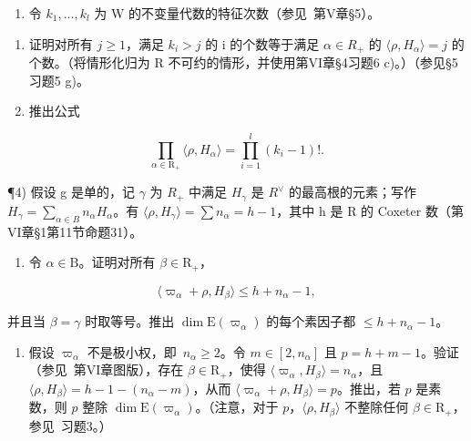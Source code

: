 \begin{enumerate}
\def\labelenumi{\arabic{enumi})}
\setcounter{enumi}{2}
\tightlist
\item
  令 \(k_{1}, \ldots, k_{l}\) 为 W 的不变量代数的特征次数（参见~第V章§5）。
\end{enumerate}

\begin{enumerate}
\def\labelenumi{\alph{enumi})}
\item
  证明对所有 \(j \geq 1\)，满足 \(k_{i} > j\) 的 i 的个数等于满足 \(\alpha \in R_{+}\) 的 \(\langle \rho, H_{\alpha} \rangle = j\) 的个数。（将情形化归为 R 不可约的情形，并使用第VI章§4习题6 c)。）（参见§5习题5 g)。
\item
  推出公式
\end{enumerate}

\[
\prod_ {\alpha \in \mathrm{R} _ {+}} \langle \rho , H _ {\alpha} \rangle = \prod_ {i = 1} ^ {l} (k _ {i} - 1)!.
\]

¶4) 假设 g 是单的，记 \(\gamma\) 为 \(R_{+}\) 中满足 \(H_{\gamma}\) 是 \(R^{\vee}\) 的最高根的元素；写作 \(H_{\gamma} = \sum_{\alpha \in B} n_{\alpha} H_{\alpha}\)。有 \(\langle \rho, H_{\gamma} \rangle = \sum n_{\alpha} = h - 1\)，其中 h 是 R 的 Coxeter 数（第VI章§1第11节命题31）。

\begin{enumerate}
\def\labelenumi{\alph{enumi})}
\tightlist
\item
  令 \(\alpha \in \mathrm{B}\)。证明对所有 \(\beta \in \mathrm{R}_{+}\)，
\end{enumerate}

\[
\langle \varpi_ {\alpha} + \rho , H _ {\beta} \rangle \leq h + n _ {\alpha} - 1,
\]

并且当 \(\beta = \gamma\) 时取等号。推出 \(\dim \mathrm{E}(\varpi_{\alpha})\) 的每个素因子都 \(\leq h + n_{\alpha} - 1\)。

\begin{enumerate}
\def\labelenumi{\alph{enumi})}
\setcounter{enumi}{1}
\tightlist
\item
  假设 \(\varpi_{\alpha}\) 不是极小权，即~\(n_{\alpha} \geq 2\)。令 \(m \in [2, n_{\alpha}]\) 且 \(p = h + m - 1\)。验证（参见~第VI章图版），存在 \(\beta \in \mathrm{R}_{+}\)，使得 \(\langle \varpi_{\alpha}, H_{\beta} \rangle = n_{\alpha}\)，且 \(\langle \rho, H_{\beta} \rangle = h - 1 - (n_{\alpha} - m)\)，从而 \(\langle \varpi_{\alpha} + \rho, H_{\beta} \rangle = p\)。推出，若 \(p\) 是素数，则 \(p\) 整除 \(\dim \mathrm{E}(\varpi_{\alpha})\)。（注意，对于 \(p\)，\(\langle \rho, H_{\beta} \rangle\) 不整除任何 \(\beta \in \mathrm{R}_{+}\)，参见~习题3。）
\end{enumerate}

